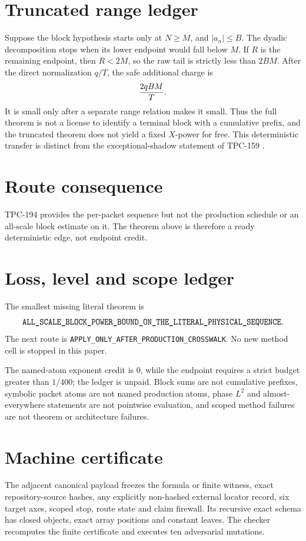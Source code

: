 \documentclass[11pt]{article}
\begin{document}
\section{Truncated range ledger}
Suppose the block hypothesis starts only at \(N\ge M\), and
\(|a_n|\le B\).  The dyadic decomposition stops when its lower endpoint
would fall below \(M\).  If \(R\) is the remaining endpoint, then
\(R<2M\), so the raw tail is strictly less than \(2BM\).  After the direct
normalization \(q/T\), the safe additional charge is
\[
 {2qBM\over T}.
\]
It is small only after a separate range relation makes it small.  Thus the
full theorem is not a license to identify a terminal block with a cumulative
prefix, and the truncated theorem does not yield a fixed \(X\)-power for
free.  This deterministic transfer is distinct from the exceptional-shadow
statement of TPC-159 \citep{WangTPC159}.

\section{Route consequence}
TPC-194 provides the per-packet sequence but not the production schedule or
an all-scale block estimate on it.  The theorem above is therefore a ready
deterministic edge, not endpoint credit.


\section{Loss, level and scope ledger}
The smallest missing literal theorem is
\[
\texttt{ALL\_\allowbreak{}SCALE\_\allowbreak{}BLOCK\_\allowbreak{}POWER\_\allowbreak{}BOUND\_\allowbreak{}ON\_\allowbreak{}THE\_\allowbreak{}LITERAL\_\allowbreak{}PHYSICAL\_\allowbreak{}SEQUENCE}.
\]
The next route is \texttt{APPLY\_\allowbreak{}ONLY\_\allowbreak{}AFTER\_\allowbreak{}PRODUCTION\_\allowbreak{}CROSSWALK}.
No new method cell is stopped in this paper.

The named-atom exponent credit is \(0\), while the endpoint requires a
strict budget greater than \(1/400\); the ledger is unpaid.  Block sums are
not cumulative prefixes, symbolic packet atoms are not named production
atoms, phase \(L^2\) and almost-everywhere statements are not pointwise
evaluation, and scoped method failures are not theorem or architecture
failures.

\section{Machine certificate}
The adjacent canonical payload freezes the formula or finite witness,
exact repository-source hashes, any explicitly non-hashed external locator
record, six target axes, scoped stop, route state and claim firewall.  Its
recursive exact schema has closed objects, exact array positions and
constant leaves.  The checker recomputes the finite certificate and executes
ten adversarial mutations.



\end{document}

